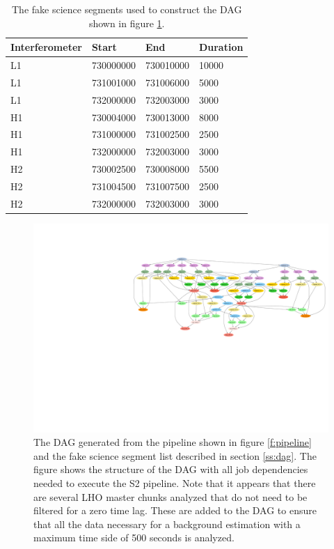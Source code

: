 \begin{table}[p]
\begin{center}
\begin{tabular}{llll}
Interferometer&Start&End&Duration\\
\hline
L1 &  730000000 &730010000 &  10000  \\
L1 &  731001000 &731006000 &   5000  \\
L1 &  732000000 &732003000 &   3000  \\
\hline
H1 &  730004000 &730013000 &   8000  \\
H1 &  731000000 &731002500 &   2500  \\
H1 &  732000000 &732003000 &   3000  \\
\hline
H2 &  730002500 &730008000 &   5500  \\
H2 &  731004500 &731007500 &   2500  \\
H2 &  732000000 &732003000 &   3000
\end{tabular}
\end{center}
\caption[Fake Science Segments Used to Test DAG Generation]{
\label{t:fakesegslist}
The fake science segments used to construct the DAG shown in figure
\ref{f:fake_segs_dag}.
}
\end{table}

\begin{figure}
\begin{center}
\hspace*{-0.2in}\includegraphics[width=\linewidth]{figures/pipeline/fake_segs_dag}
\end{center}
\caption[DAG Generated from Fake Segments]{%
\label{f:fake_segs_dag}
The DAG generated from the pipeline shown in figure \ref{f:pipeline} and the
fake science segment list described in section \ref{ss:dag}. The figure shows
the structure of the DAG with all job dependencies needed to execute the S2
pipeline. Note that it appears that there are several LHO master chunks
analyzed that do not need to be filtered for a zero time lag.  These are added
to the DAG to ensure that all the data necessary for a background estimation
with a maximum time side of 500 seconds is analyzed.
}
\end{figure}


